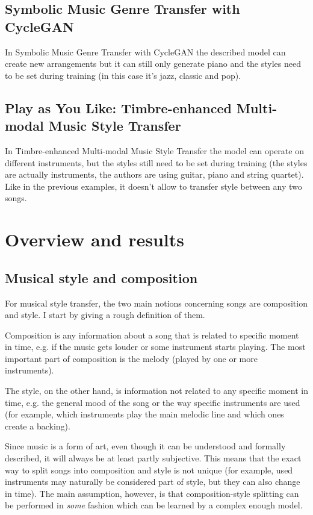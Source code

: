 \documentclass[en]{pracamgr}
\begin{document}
\section{Symbolic Music Genre Transfer with CycleGAN}

In Symbolic Music Genre Transfer with CycleGAN \cite{cyclegan} the described model can create new arrangements but it can still only generate piano and the styles need to be set during training (in this case it's jazz, classic and pop).

\section{Play as You Like: Timbre-enhanced Multi-modal Music Style Transfer}

In Timbre-enhanced Multi-modal Music Style Transfer \cite{multimodal} the model can operate on different instruments, but the styles still need to be set during training (the styles are actually instruments, the authors are using guitar, piano and string quartet).
Like in the previous examples, it doesn't allow to transfer style between any two songs.

\chapter{Overview and results}

\section{Musical style and composition}

For musical style transfer, the two main notions concerning songs are composition and style.
I start by giving a rough definition of them.

Composition is any information about a song that is related to specific moment in time, e.g. if the music gets louder or some instrument starts playing.
The most important part of composition is the melody (played by one or more instruments).

The style, on the other hand, is information not related to any specific moment in time, e.g. the general mood of the song or the way specific instruments are used (for example, which instruments play the main melodic line and which ones create a backing).

Since music is a form of art, even though it can be understood and formally described, it will always be at least partly subjective.
This means that the exact way to split songs into composition and style is not unique (for example, used instruments may naturally be considered part of style, but they can also change in time).
The main assumption, however, is that composition-style splitting can be performed in \emph{some} fashion which can be learned by a complex enough model.
\end{document}
